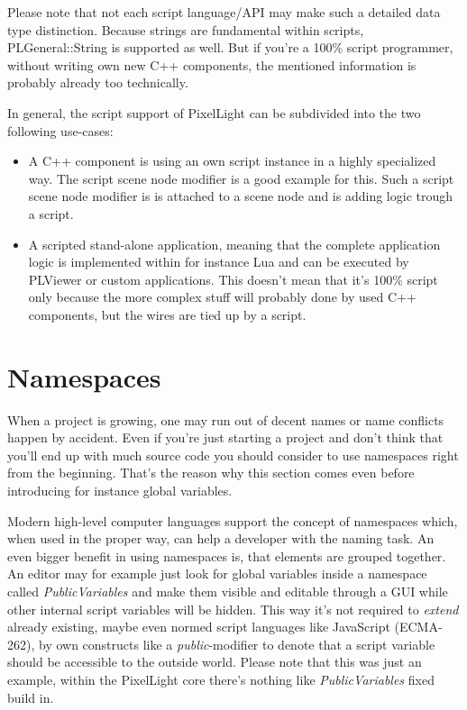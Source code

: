 Please note that not each script language/API may make such a detailed data type distinction. Because strings are fundamental within scripts, PLGeneral::String is supported as well. But if you're a 100\% script programmer, without writing own new C++ components, the mentioned information is probably already too technically.

In general, the script support of PixelLight can be subdivided into the two following use-cases:
\begin{itemize}
\item{A C++ component is using an own script instance in a highly specialized way. The script scene node modifier is a good example for this. Such a script scene node modifier is is attached to a scene node and is adding logic trough a script.}
\item{A scripted stand-alone application, meaning that the complete application logic is implemented within for instance Lua and can be executed by PLViewer or custom applications. This doesn't mean that it's 100\% script only because the more complex stuff will probably done by used C++ components, but the wires are tied up by a script.}
\end{itemize}




\section{Namespaces}
\label{Script_Namespaces}
When a project is growing, one may run out of decent names or name conflicts happen by accident. Even if you're just starting a project and don't think that you'll end up with much source code you should consider to use namespaces right from the beginning. That's the reason why this section comes even before introducing for instance global variables.

Modern high-level computer languages support the concept of namespaces which, when used in the proper way, can help a developer with the naming task. An even bigger benefit in using namespaces is, that elements are grouped together. An editor may for example just look for global variables inside a namespace called \emph{PublicVariables} and make them visible and editable through a GUI while other internal script variables will be hidden. This way it's not required to \emph{extend} already existing, maybe even normed script languages like JavaScript (ECMA-262), by own constructs like a \emph{public}-modifier to denote that a script variable should be accessible to the outside world. Please note that this was just an example, within the PixelLight core there's nothing like \emph{PublicVariables} fixed build in.

